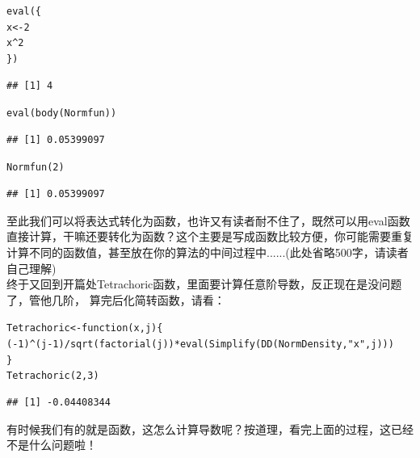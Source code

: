 \documentclass[a4paper]{ctexart}\usepackage[]{graphicx}\usepackage[]{color}
\makeatletter
\newcommand{\hlnum}[1]{\textcolor[rgb]{0.502,0.086,1}{#1}}%
\newcommand{\hlstr}[1]{\textcolor[rgb]{1,0.4,0.2}{#1}}%
\newcommand{\hlopt}[1]{\textcolor[rgb]{0.251,0.251,0.251}{#1}}%
\newcommand{\hlstd}[1]{\textcolor[rgb]{0.251,0.251,0.251}{#1}}%
\newcommand{\hlkwa}[1]{\textcolor[rgb]{0.941,0.188,0.816}{#1}}%
\newcommand{\hlkwb}[1]{\textcolor[rgb]{0,0.439,0.902}{#1}}%
\newcommand{\hlkwc}[1]{\textcolor[rgb]{0.188,0.941,0.314}{#1}}%
\newcommand{\hlkwd}[1]{\textcolor[rgb]{0.69,0.188,0.941}{#1}}%
\newenvironment{kframe}{%
 \def\at@end@of@kframe{}%
 \ifinner\ifhmode%
  \def\at@end@of@kframe{\end{minipage}}%
  \begin{minipage}{\columnwidth}%
 \fi\fi%
 \def\FrameCommand##1{\hskip\@totalleftmargin \hskip-\fboxsep
 \colorbox{shadecolor}{##1}\hskip-\fboxsep
     \hskip-\linewidth \hskip-\@totalleftmargin \hskip\columnwidth}%
 \MakeFramed {\advance\hsize-\width
   \@totalleftmargin\z@ \linewidth\hsize
   \@setminipage}}%
 {\par\unskip\endMakeFramed%
 \at@end@of@kframe}
\newenvironment{knitrout}{}{} %
\makeatother
\begin{document}
\begin{knitrout}
\color{fgcolor}\begin{kframe}
\begin{alltt}
\hlkwd{eval}\hlstd{(\{}
    \hlstd{x} \hlkwb{<-} \hlnum{2}
    \hlstd{x}\hlopt{^}\hlnum{2}
\hlstd{\})}
\end{alltt}
\begin{verbatim}
## [1] 4
\end{verbatim}
\begin{alltt}
\hlkwd{eval}\hlstd{(}\hlkwd{body}\hlstd{(Normfun))}
\end{alltt}
\begin{verbatim}
## [1] 0.05399097
\end{verbatim}
\begin{alltt}
\hlkwd{Normfun}\hlstd{(}\hlnum{2}\hlstd{)}
\end{alltt}
\begin{verbatim}
## [1] 0.05399097
\end{verbatim}
\end{kframe}
\end{knitrout}
至此我们可以将表达式转化为函数，也许又有读者耐不住了，既然可以用eval函数直接计算，干嘛还要转化为函数？这个主要是写成函数比较方便，你可能需要重复计算不同的函数值，甚至放在你的算法的中间过程中......(此处省略500字，请读者自己理解)\\
终于又回到开篇处Tetrachoric函数，里面要计算任意阶导数，反正现在是没问题了，管他几阶，
算完后化简转函数，请看：
\begin{knitrout}
\color{fgcolor}\begin{kframe}
\begin{alltt}
\hlstd{Tetrachoric} \hlkwb{<-} \hlkwa{function}\hlstd{(}\hlkwc{x}\hlstd{,} \hlkwc{j}\hlstd{) \{}
    \hlstd{(}\hlopt{-}\hlnum{1}\hlstd{)}\hlopt{^}\hlstd{(j} \hlopt{-} \hlnum{1}\hlstd{)}\hlopt{/}\hlkwd{sqrt}\hlstd{(}\hlkwd{factorial}\hlstd{(j))} \hlopt{*} \hlkwd{eval}\hlstd{(}\hlkwd{Simplify}\hlstd{(}\hlkwd{DD}\hlstd{(NormDensity,} \hlstr{"x"}\hlstd{, j)))}
\hlstd{\}}
\hlkwd{Tetrachoric}\hlstd{(}\hlnum{2}\hlstd{,} \hlnum{3}\hlstd{)}
\end{alltt}
\begin{verbatim}
## [1] -0.04408344
\end{verbatim}
\end{kframe}
\end{knitrout}
有时候我们有的就是函数，这怎么计算导数呢？按道理，看完上面的过程，这已经不是什么问题啦！
\end{document}
